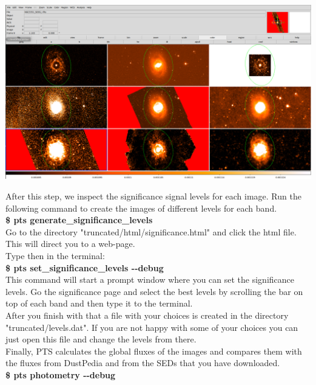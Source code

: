 \documentclass[15pt,a4paper,oneside,openright]{report}
\begin{document}
\begin{center}
\includegraphics[width=1.0\textwidth]{figures/truncation_ellipse.png}
\end{center}

After this step, we inspect the significance signal levels for each image. Run the following command to create the images of different levels for each band.\\

\textbf{\$ pts generate\_significance\_levels}\\

Go to the directory "truncated/html/significance.html" and click the html file. This will direct you to a web-page.\\

Type then in the terminal:\\

\textbf{\$ pts set\_significance\_levels -{}-debug}\\ 

This command will start a prompt window where you can set the significance levels. Go the significance page and select the best levels by scrolling the bar on top of each band and then type it to the terminal.\\

After you finish with that a file with your choices is created in the directory "truncated/levels.dat". If you are not happy with some of your choices you can just open this file and change the levels from there.\\

Finally, PTS calculates the global fluxes of the images and compares them with the fluxes from DustPedia and from the SEDs that you have downloaded.\\  

\textbf{\$ pts photometry -{}-debug}\\
\end{document}
